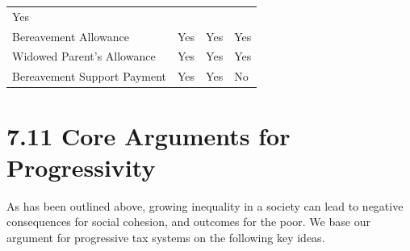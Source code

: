 \documentclass[]{tufte-handout}
\begin{document}
\begin{longtable}[]{@{}llll@{}}
\begin{minipage}[t]{0.24\columnwidth}
Yes\strut
\end{minipage}\tabularnewline
\begin{minipage}[t]{0.33\columnwidth}\raggedright
Bereavement Allowance\strut
\end{minipage} & \begin{minipage}[t]{0.15\columnwidth}\raggedright
Yes\strut
\end{minipage} & \begin{minipage}[t]{0.17\columnwidth}\raggedright
Yes\strut
\end{minipage} & \begin{minipage}[t]{0.24\columnwidth}\raggedright
Yes\strut
\end{minipage}\tabularnewline
\begin{minipage}[t]{0.33\columnwidth}\raggedright
Widowed Parent's Allowance\strut
\end{minipage} & \begin{minipage}[t]{0.15\columnwidth}\raggedright
Yes\strut
\end{minipage} & \begin{minipage}[t]{0.17\columnwidth}\raggedright
Yes\strut
\end{minipage} & \begin{minipage}[t]{0.24\columnwidth}\raggedright
Yes\strut
\end{minipage}\tabularnewline
\begin{minipage}[t]{0.33\columnwidth}\raggedright
Bereavement Support Payment\strut
\end{minipage} & \begin{minipage}[t]{0.15\columnwidth}\raggedright
Yes\strut
\end{minipage} & \begin{minipage}[t]{0.17\columnwidth}\raggedright
Yes\strut
\end{minipage} & \begin{minipage}[t]{0.24\columnwidth}\raggedright
No\strut
\end{minipage}\tabularnewline
\bottomrule
\end{longtable}

\hypertarget{core-arguments-for-progressivity}{%
\section{7.11 Core Arguments for
Progressivity}\label{core-arguments-for-progressivity}}

As has been outlined above, growing inequality in a society can lead to
negative consequences for social cohesion, and outcomes for the poor. We
base our argument for progressive tax systems on the following key
ideas.
\end{document}
